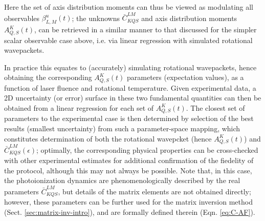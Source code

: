 \documentclass[10pt]{article}
\begin{document}

Here the set of axis distribution moments can thus be viewed as modulating all observables $\beta_{L,M}^{u}(t)$; the unknowns $\bar{C}_{KQS}^{LM}$ and axis distribution moments $A_{Q,S}^{K}(t)$, can be retrieved in a similar manner to that discussed for the simpler scalar observable case above, i.e. via linear regression with simulated rotational wavepackets. 

In practice this equates to (accurately) simulating rotational wavepackets, hence obtaining the corresponding $A_{Q,S}^{K}(t)$ parameters (expectation values), as a function of laser fluence and rotational temperature. Given experimental data, a 2D uncertainty (or error) surface in these two fundamental quantities can then be obtained from a linear regression for each set of $A_{Q,S}^{K}(t)$. The closest set of parameters to the experimental case is then determined by selection of the best results (smallest uncertainty) from such a parameter-space mapping, which constitutes determination of both the rotational wavepcket (hence $A_{Q,S}^{K}(t)$) and $\bar{C}_{KQS}^{LM}(\epsilon)$; optimally, the corresponding physical properties can be cross-checked with other experimental estimates for additional confirmation of the fiedelity of the protocol, although this may not always be possible. Note that, in this case, the photoionization dynamics are phenomenologically described by the real parameters $\bar{C}_{KQS}^{LM}$, but details of the matrix elements are not obtained directly; however, these parameters can be further used for the matrix inversion method (Sect. \ref{sec:matrix-inv-intro}), and are formally defined therein (Eqn. \ref{eq:C-AF}).

\end{document}
